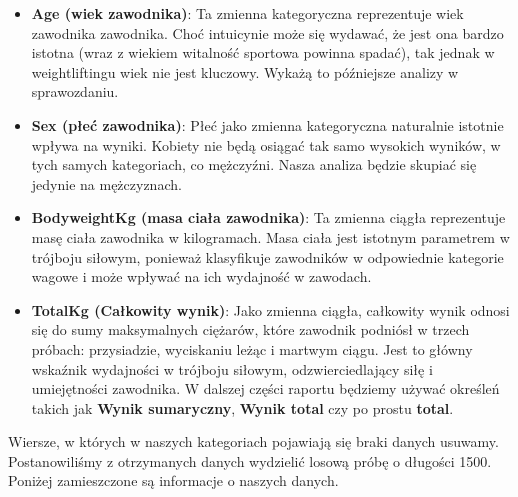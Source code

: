 \documentclass{article}\usepackage[]{graphicx}\usepackage[]{xcolor}
\begin{document}
    \begin{itemize}
        \item \textbf{Age (wiek zawodnika)}: Ta zmienna kategoryczna reprezentuje wiek zawodnika zawodnika. Choć intuicynie może się wydawać, że jest ona bardzo istotna (wraz z wiekiem witalność sportowa powinna spadać), tak jednak w weightliftingu wiek nie jest kluczowy. Wykażą to późniejsze analizy w sprawozdaniu.
        \item \textbf{Sex (płeć zawodnika)}: Płeć jako zmienna kategoryczna naturalnie istotnie wpływa na wyniki. Kobiety nie będą osiągać tak samo wysokich wyników, w tych samych kategoriach, co mężczyźni. Nasza analiza będzie skupiać się jedynie na mężczyznach.
        \item \textbf{BodyweightKg (masa ciała zawodnika)}: Ta zmienna ciągła reprezentuje masę ciała zawodnika w kilogramach. Masa ciała jest istotnym parametrem w trójboju siłowym, ponieważ klasyfikuje zawodników w odpowiednie kategorie wagowe i może wpływać na ich wydajność w zawodach.
        \item \textbf{TotalKg (Całkowity wynik)}: Jako zmienna ciągła, całkowity wynik odnosi się do sumy maksymalnych ciężarów, które zawodnik podniósł w trzech próbach: przysiadzie, wyciskaniu leżąc i martwym ciągu. Jest to główny wskaźnik wydajności w trójboju siłowym, odzwierciedlający siłę i umiejętności zawodnika. W dalszej części raportu będziemy używać określeń takich jak \textbf{Wynik sumaryczny}, \textbf{Wynik total} czy po prostu \textbf{total}.
    \end{itemize}
     
Wiersze, w których w naszych kategoriach pojawiają się braki danych usuwamy. Postanowiliśmy z otrzymanych danych wydzielić losową próbę o długości 1500. Poniżej zamieszczone są informacje o naszych danych.
\end{document}
